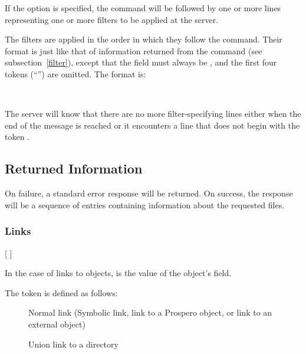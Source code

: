 If the  option is specified, the  command will
be followed by one or more lines representing one or more
 filters to
be applied at the server.

The filters are applied in the order in which they follow the
 command.  Their format is just like that of 
 information returned from the  command (see
subsection~\ref{filter}), except that the  field must always
be , and the first four tokens (``'') are omitted.  The format is:
\begin{command}
     
  \\
	         \zoos {} \zoms{}\zome \zooe
\end{command}
The server will know that there are no more filter-specifying lines
either when the end of the message is reached or it encounters a line
that does not begin with the token .

\subsection{Returned Information}

On failure, a standard error response will be returned.  On success,
the response will be a sequence of entries containing information
about the requested files.

\subsubsection{Links}

\begin{command}
        
	  
	 [   ]
\end{command}

In the case of links to objects,  is the value
of the object's  field.  

The 
token is defined as follows:
\begin{description}
\item[] Normal link (Symbolic link, link to a Prospero object,
or link to an external object)
\item[] Union link to a directory
\end{description}

